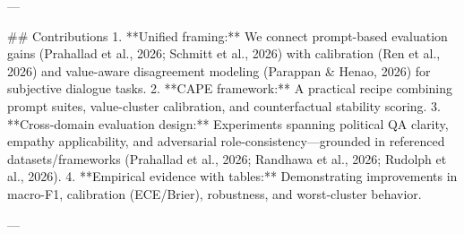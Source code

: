 ---

## Contributions  
1. **Unified framing:** We connect prompt-based evaluation gains (Prahallad et al., 2026; Schmitt et al., 2026) with calibration (Ren et al., 2026) and value-aware disagreement modeling (Parappan & Henao, 2026) for subjective dialogue tasks.  
2. **CAPE framework:** A practical recipe combining prompt suites, value-cluster calibration, and counterfactual stability scoring.  
3. **Cross-domain evaluation design:** Experiments spanning political QA clarity, empathy applicability, and adversarial role-consistency—grounded in referenced datasets/frameworks (Prahallad et al., 2026; Randhawa et al., 2026; Rudolph et al., 2026).  
4. **Empirical evidence with tables:** Demonstrating improvements in macro-F1, calibration (ECE/Brier), robustness, and worst-cluster behavior.

---